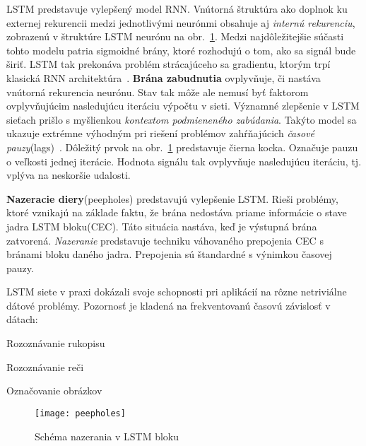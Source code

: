 LSTM predstavuje vylepšený model RNN. Vnútorná štruktúra ako doplnok ku externej rekurencii medzi jednotlivými neurónmi obsahuje aj \textit{internú rekurenciu}, zobrazenú v štruktúre LSTM neurónu na obr.~\ref{fig:lstm}. Medzi najdôležitejšie súčasti tohto modelu patria sigmoidné brány, ktoré rozhodujú o tom, ako sa signál bude širiť. LSTM tak prekonáva problém strácajúceho sa gradientu, ktorým trpí klasická RNN architektúra~\cite{hochreiter1997long}.
\newline
\textbf{Brána zabudnutia} ovplyvňuje, či nastáva vnútorná rekurencia neurónu. Stav tak môže ale nemusí byť faktorom ovplyvňujúcim nasledujúcu iteráciu výpočtu v sieti. Významné zlepšenie v LSTM sieťach prišlo s myšlienkou \textit{kontextom podmieneného zabúdania}. Takýto model sa ukazuje extrémne výhodným pri riešení problémov zahŕňajúcich \textit{časové pauzy}(lags)~\cite{gers2000learning}.
 Dôležitý prvok  na obr.~\ref{fig:lstm} predstavuje čierna kocka. Označuje pauzu o veľkosti jednej iterácie. Hodnota signálu tak ovplyvňuje nasledujúcu iteráciu, tj. vplýva na neskoršie udalosti.
\newline
\noindent


\textbf{Nazeracie diery}(peepholes) predstavujú vylepšenie LSTM. Rieši problémy, ktoré vznikajú na základe faktu, že brána nedostáva priame informácie o stave jadra LSTM bloku(CEC). Táto situácia nastáva, keď je výstupná brána zatvorená. \textit{Nazeranie} predstavuje techniku váhovaného prepojenia CEC s bránami bloku daného jadra. Prepojenia sú štandardné s výnimkou časovej pauzy.

LSTM siete v praxi dokázali svoje schopnosti pri aplikácií na rôzne netriviálne dátové problémy. Pozornosť je kladená na frekventovanú časovú závislosť v dátach:
\begin{my_itemize}
	\item{Rozoznávanie rukopisu} ~\cite{greff2015lstm}
	\item{Rozoznávanie reči} ~\cite{graves2013speech}
	\item{Označovanie obrázkov} ~\cite{kiros2014unifying}
\end{my_itemize}


\begin{figure}[H]
\begin{center}
\texttt{[image: peepholes]}\end{center}
\caption[peepholes]{Schéma nazerania v LSTM bloku~\cite{gers2003learning}}
\label{fig:lstm}
\end{figure}

